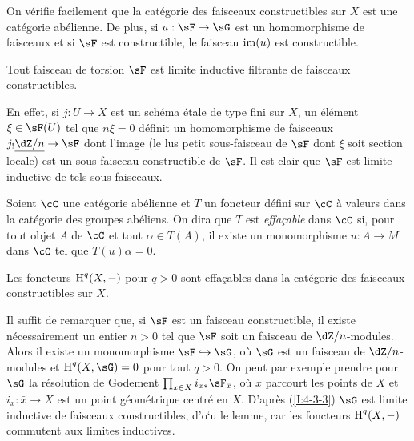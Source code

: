 On vérifie facilement que la catégorie des faisceaux constructibles sur $X$ 
est une catégorie abélienne. De plus, si $u:\sF\to \sG$ est un homomorphisme de 
faisceaux et si $\sF$ est constructible, le faisceau $\operatorname{im}(u)$ est constructible.





\begin{lemma}\label{I:4-3-3}
Tout faisceau de torsion $\sF$ est limite inductive filtrante de faisceaux 
constructibles.
\end{lemma}

En effet, si $j:U\to X$ est un schéma étale de type fini sur $X$, un 
élément $\xi\in \sF(U)$ tel que $n\xi=0$ définit un homomorphisme de 
faisceaux $j_! \const{\dZ/n}\to \sF$ dont l'image (le lus petit sous-faisceau de 
$\sF$ dont $\xi$ soit section locale) est un sous-faisceau constructible de $\sF$. 
Il est clair que $\sF$ est limite inductive de tels sous-faisceaux.





\begin{definition}\label{I:4-3-4}
Soient $\cC$ une catégorie abélienne et $T$ un foncteur défini sur $\cC$ 
à valeurs dans la catégorie des groupes abéliens. On dira que $T$ est 
\emph{effaçable} dans $\cC$ si, pour tout objet $A$ de $\cC$ et tout 
$\alpha\in T(A)$, il existe un monomorphisme $u:A\to M$ dans $\cC$ tel que 
$T(u)\alpha = 0$. 
\end{definition}





\begin{lemma}\label{I:4-3-5}
Les foncteurs $\operatorname{H}^q(X,-)$ pour $q>0$ sont effaçables dans la catégorie des 
faisceaux constructibles sur $X$.
\end{lemma}

Il suffit de remarquer que, si $\sF$ est un faisceau constructible, il existe 
nécessairement un entier $n>0$ tel que $\sF$ soit un faisceau de 
$\dZ/n$-modules. Alors il existe un monomorphisme $\sF\hookrightarrow \sG$, où 
$\sG$ est un faisceau de $\dZ/n$-modules et $\h^q(X,\sG) = 0$ pour tout $q>0$.  
On peut par exemple prendre pour $\sG$ la résolution de Godement 
$\prod_{x\in X} i_{x*} \sF_{\bar x}$, où $x$ parcourt les points de $X$ et 
$i_x:\bar x\to X$ est un point géométrique centré en $X$. D'après 
(\ref{I:4-3-3}) $\sG$ est limite inductive de faisceaux constructibles, d'o`u le 
lemme, car les foncteurs $\operatorname{H}^q(X,-)$ commutent aux limites inductives. 





